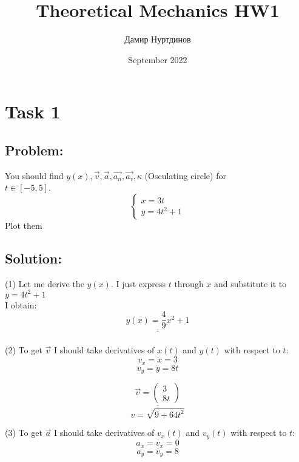 \documentclass[a4paper,11pt,oneside,article]{memoir}
\title{Theoretical Mechanics HW1}
\author{Дамир Нуртдинов}
\date{September 2022}
\def\doubleunderline#1{\underline{\underline{#1}}}
\begin{document}
\section*{Task 1}

\subsection{Problem:}
You should find $y(x), \overrightarrow{v}, \overrightarrow{a}, \overrightarrow{a_n},\overrightarrow{a_\tau}, \kappa$ (Osculating circle) for \\
$t \in [-5,5]$.
\begin{equation}
\begin{cases}
        x = 3t
        \\
        y = 4t^2 + 1
\end{cases}
\end{equation}
Plot them
\subsection{Solution:}
(1) Let me derive the $y(x)$. I just express $t$ through $x$ and substitute it to $y = 4t^2 + 1$ \\
I obtain: \\
\begin{equation*}
 \doubleunderline{y(x) = \frac{4}{9} x^2 +1}
\end{equation*}
\\
(2) To get $\overrightarrow{v}$ I should take derivatives of $x(t)$ and $y(t)$ with respect to $t$:
\begin{equation*}
 v_x = \dot{x} = 3
\end{equation*}
\begin{equation*}
 v_y = \dot{y} = 8t
\end{equation*}

\begin{equation*}
\doubleunderline{
\overrightarrow{v}=
    \begin{pmatrix}
    3\\
    8t
    \end{pmatrix}
}
\end{equation*}
\begin{equation*}
 v = \sqrt{9+64t^2}
\end{equation*}

(3) To get $\overrightarrow{a}$ I should take derivatives of $v_x(t)$ and $v_y(t)$ with respect to $t$:
\begin{equation*}
 a_x = \dot{v_x} = 0
\end{equation*}
\begin{equation*}
 a_y = \dot{v_y} = 8
\end{equation*}
\end{document}
